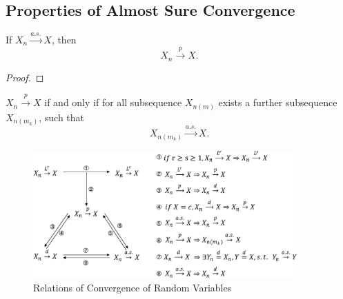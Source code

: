 \subsection{Properties of Almost Sure Convergence}

\begin{theorem}{}{}
    If $X_{n}\stackrel{a.s.}{\rightarrow}X$, then
    \begin{equation}
        X_{n}\stackrel{p}{\rightarrow}X.
    \end{equation}
\end{theorem}

\begin{proof}
    
\end{proof}

\begin{theorem}{}{}
    $X_n\stackrel{p}{\rightarrow}X$ if and only if for all subsequence $X_{n(m)}$ exists a further subsequence $X_{n(m_k)}$, such that
    \begin{equation}
        X_{n(m_k)}\stackrel{a.s.}{\rightarrow}X.
    \end{equation}
\end{theorem}


\begin{figure}[htp]
    \centering
    \includegraphics[width=0.9\textwidth]{./probability-theory/figures/relation-of-convergences.eps}
    \caption{Relations of Convergence of Random Variables}
\end{figure}
